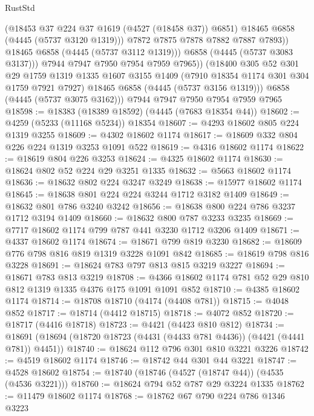 \begin{lexlean}{RustStd}
\begin{coremodule}
{\begin{coremodule}
{{{{{{{{{{{{{{{{{{{{{{{{{{{{{{{{{{{{{{                    (@18453 @37 @224 @37 @1619 (@4527 (@18458 @37)) @6851)
                    @18465
                    @6858
                    (@4445 (@5737 @3120 @1319)))
                  @7872
                  @7875
                  @7878
                  @7882
                  @7887
                  @7893))
              @18465
              @6858
              (@4445 (@5737 @3112 @1319)))
            @6858
            (@4445 (@5737 @3083 @3137)))
          @7944
          @7947
          @7950
          @7954
          @7959
          @7965))
      (@18400
        @305
        @52
        @301
        @29
        @1759
        @1319
        @1335
        @1607
        @3155
        @1409
        (@7910 @18354 @1174 @301 @304 @1759 @7921 @7927)
        @18465
        @6858
        (@4445 (@5737 @3156 @1319)))
      @6858
      (@4445 (@5737 @3075 @3162)))
    @7944
    @7947
    @7950
    @7954
    @7959
    @7965
@18598 := @18383 (@18389 @18592) (@4445 (@7683 @18354 @44))
@18602 := @4259 (@5233 (@11168 @5234)) @18354
@18607 := @4293 @18602 @805 @224 @1319 @3255
@18609 := @4302 @18602 @1174
@18617 := @18609 @332 @804 @226 @224 @1319 @3253 @1091 @522
@18619 := @4316 @18602 @1174
@18622 := @18619 @804 @226 @3253
@18624 := @4325 @18602 @1174
@18630 := @18624 @802 @52 @224 @29 @3251 @1335
@18632 := @5663 @18602 @1174
@18636 := @18632 @802 @224 @3247 @3249
@18638 := @15977 @18602 @1174
@18645 := @18638 @801 @224 @224 @3244 @1712 @3182 @1409
@18649 := @18632 @801 @786 @3240 @3242
@18656 := @18638 @800 @224 @786 @3237 @1712 @3194 @1409
@18660 := @18632 @800 @787 @3233 @3235
@18669 := @7717 @18602 @1174 @799 @787 @441 @3230 @1712 @3206 @1409
@18671 := @4337 @18602 @1174
@18674 := @18671 @799 @819 @3230
@18682 := @18609 @776 @798 @816 @819 @1319 @3228 @1091 @842
@18685 := @18619 @798 @816 @3228
@18691 := @18624 @783 @797 @813 @815 @3219 @3227
@18694 := @18671 @783 @813 @3219
@18708 := @4366 @18602 @1174 @781 @52 @29 @810 @812 @1319 @1335 @4376 @175 @1091 @1091 @852
@18710 := @4385 @18602 @1174
@18714 := @18708 @18710 (@4174 (@4408 @781))
@18715 := @4048 @852
@18717 := @18714 (@4412 @18715)
@18718 := @4072 @852
@18720 := @18717 (@4416 @18718)
@18723 := @4421 (@4423 @810 @812)
@18734 := @18691 (@18694 (@18720 @18723 (@4431 (@4433 @781 @4436)) (@4421 (@4441 @781)) @4451))
@18740 := @18624 @112 @796 @301 @810 @3221 @3226
@18742 := @4519 @18602 @1174
@18746 := @18742 @44 @301 @44 @3221
@18747 := @4528 @18602
@18754 := @18740 (@18746 (@4527 (@18747 @44)) (@4535 (@4536 @3221)))
@18760 := @18624 @794 @52 @787 @29 @3224 @1335
@18762 := @11479 @18602 @1174
@18768 := @18762 @67 @790 @224 @786 @1346 @3223
}}}}}}}}}}}}}}}}}}}}}}}}}}}}}}}}}}}}}}
\end{coremodule}}
\end{coremodule}
\end{lexlean}
